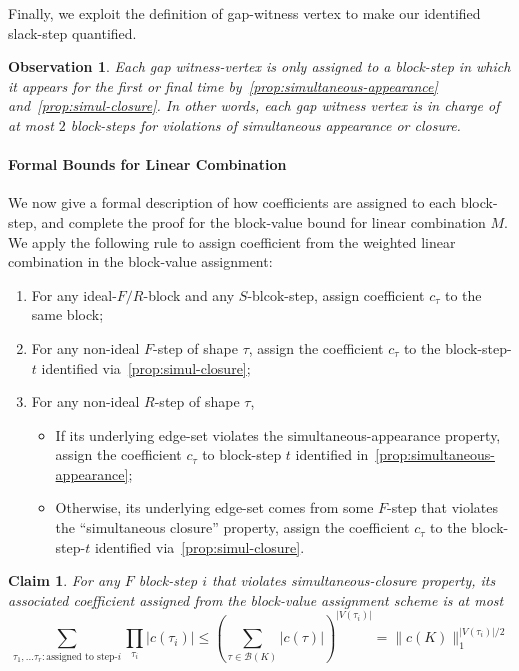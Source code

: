 \documentclass[12pt]{article}
\newtheorem{claim}[theorem]{Claim}
\newtheorem{observation}[theorem]{Observation}
\newcommand{\calB}{\mathcal{B}}
\begin{document}
Finally, we exploit the definition of gap-witness vertex to make our identified slack-step quantified.

\begin{observation}
	Each gap witness-vertex is only assigned to a block-step in which it appears for the first or final time by~\cref{prop:simultaneous-appearance} and~\cref{prop:simul-closure}. In other words, each gap witness vertex is in charge of at most $2$ block-steps for violations of simultaneous appearance or closure.
\end{observation}


\paragraph{Formal Bounds for Linear Combination}

We now give a formal description of how coefficients are assigned to each block-step, and complete the proof for the block-value bound for linear combination $M$. We apply the following rule to assign coefficient from the weighted linear combination in the block-value assignment:
\begin{enumerate}
	\item For any ideal-$F/R$-block and any $S$-blcok-step, assign coefficient $c_\tau$ to the same block;
	\item For any non-ideal $F$-step of shape $\tau$, assign the coefficient $c_\tau$ to the block-step-$t$ identified via~\cref{prop:simul-closure};
	\item For any non-ideal $R$-step of shape $\tau$,\begin{itemize}
		\item  If its underlying edge-set violates the simultaneous-appearance property, assign the coefficient $c_\tau$ to block-step $t$ identified in~\cref{prop:simultaneous-appearance};
	\item Otherwise, its underlying edge-set comes from some $F$-step that violates  the ``simultaneous closure'' property, assign the coefficient $c_\tau$ to the block-step-$t$ identified via~\cref{prop:simul-closure}.
	\end{itemize}
\end{enumerate}




\begin{claim}
	For any $F$ block-step $i$ that violates simultaneous-closure property, its associated coefficient assigned from the block-value assignment scheme is at most  \[ 
	\sum_{\tau_1,...\tau_r: \text{assigned to step-}i } \prod_{\tau_i} |c(\tau_i)| \leq \left( \sum_{\tau \in \calB(K)}|c(\tau)| \right)^{|V(\tau_i)|}  =  \|c(K)\|_1^{  |V(\tau_i)|/2}
	\]
\end{claim}
\end{document}
